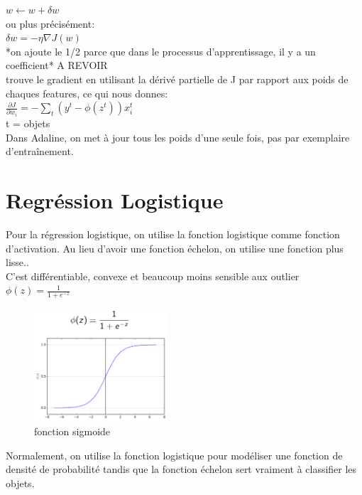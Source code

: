 \documentclass[oneside]{book}
\begin{document}
\centering
$w \leftarrow w + \delta w$\\

\justify
ou plus précisément: \\

\centering
$\delta w = - \eta \nabla J(w)$\\

\justify
*on ajoute le 1/2 parce que dans le processus d'apprentissage, il y a un coefficient* A REVOIR\\

trouve le gradient en utilisant la dérivé partielle de J par rapport aux poids de chaques features, ce qui nous donnes: \\

\centering
$\frac{\partial J}{\partial w_i} = - \sum\limits_t (y^t - \phi (z^t)) x_i^t$\\
\justify
t = objets\\

Dans Adaline, on met à jour tous les poids d'une seule fois, pas par exemplaire d'entraînement.

\section{Regréssion Logistique}
Pour la régression logistique, on utilise la fonction logistique comme fonction d'activation. Au lieu d'avoir une fonction échelon, on utilise une fonction plus lisse..\\

C'est différentiable, convexe et beaucoup moins sensible aux outlier\\

$\phi (z) = \frac{1}{1+e^{-z}}$\\

\begin{figure}
\centering
\includegraphics[width = 5cm]{sigmoide.png}
\caption{fonction sigmoide}
\label{fig:sigmoide}
\end{figure}

Normalement, on utilise la fonction logistique pour modéliser une fonction de densité de probabilité tandis que la fonction échelon sert vraiment à classifier les objets.\\
\end{document}
